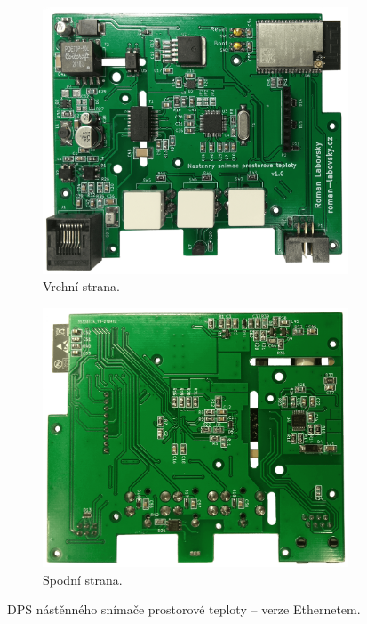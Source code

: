 \begin{figure}[H]
\centering
\begin{subfigure}{.5\textwidth}
  \centering
  \includegraphics[width=\textwidth]{images/nastenny-snimac-prostorove-teploty-ethernet/dps-nastenny-snimac-prostorove-teploty-ethernet-vrchni-cast.png}
  \caption{Vrchní strana.}
  \label{fig:dps-nastenny-snimac-prostorove-teploty-ethernet-vrchni-cast}
\end{subfigure}%
\begin{subfigure}{.5\textwidth}
  \centering
  \includegraphics[width=\textwidth]{images/nastenny-snimac-prostorove-teploty-ethernet/dps-nastenny-snimac-prostorove-teploty-ethernet-spodni-cast.png}
  \caption{Spodní strana.}
  \label{fig:dps-nastenny-snimac-prostorove-teploty-ethernet-spodni-cast}
\end{subfigure}
\caption{DPS nástěnného snímače prostorové teploty  – verze Ethernetem.}
\label{fig:dps-nastenny-snimac-prostorove-teploty-ethernet}
\end{figure}

